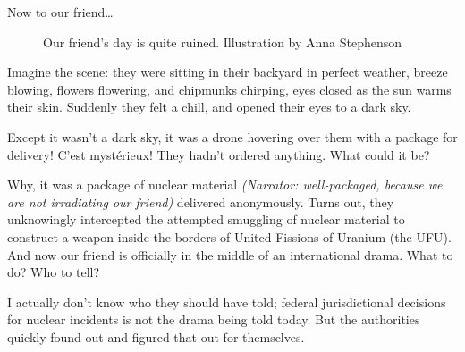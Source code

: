 {Now to our friend\ldots

\begin{figure}[!htb]
  \centering
  \large Our friend's day is quite ruined. \small Illustration by Anna Stephenson
\end{figure}

\begin{shadequote} 

  Imagine the scene: they were sitting in their backyard in perfect weather,
  breeze blowing, flowers flowering, and chipmunks chirping, eyes closed as the
  sun warms their skin. Suddenly they felt a chill, and opened their eyes to a
  dark sky.
  
  Except it wasn't a dark sky, it was a drone hovering over them with a package
  for delivery! C'est myst\'{e}rieux! They hadn't ordered anything. What could it 
  be? 
  
  Why, it was a package of nuclear material \textit{(Narrator: well-packaged,
  because we are not irradiating our friend)} delivered anonymously. Turns out,
  they unknowingly intercepted the attempted smuggling of nuclear material to
  construct a weapon inside the borders of United Fissions of Uranium (the
  UFU). And now our friend is officially in the middle of an international
  drama. What to do? Who to tell? 

\end{shadequote}

\narr I actually don't know who they should have told; federal jurisdictional
decisions for nuclear incidents is not the drama being told today. But the
authorities quickly found out and figured that out for themselves.

}
